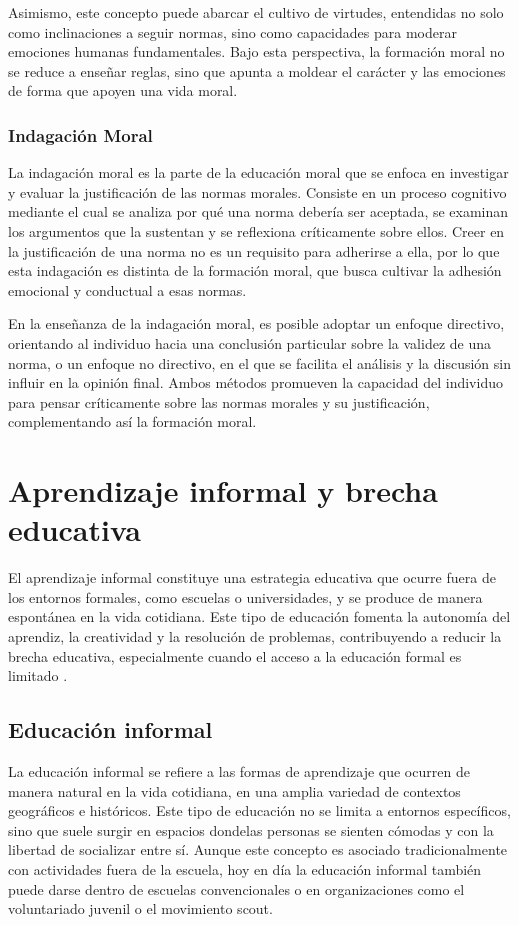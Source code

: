 Asimismo, este concepto puede abarcar el cultivo de virtudes, entendidas no
solo como inclinaciones a seguir normas, sino como capacidades para moderar
emociones humanas fundamentales. Bajo esta perspectiva, la formación moral no
se reduce a enseñar reglas, sino que apunta a moldear el carácter y las
emociones de forma que apoyen una vida moral.\cite{hand2017moral}

\subsubsection{Indagación Moral}
La indagación moral es la parte de la educación moral que se enfoca en
investigar y evaluar la justificación de las normas morales. Consiste en un
proceso cognitivo mediante el cual se analiza por qué una norma debería ser
aceptada, se examinan los argumentos que la sustentan y se reflexiona
críticamente sobre ellos. Creer en la justificación de una norma no es un
requisito para adherirse a ella, por lo que esta indagación es distinta de la
formación moral, que busca cultivar la adhesión emocional y conductual a esas
normas. \cite{hand2017moral}

En la enseñanza de la indagación moral, es posible adoptar un enfoque
directivo, orientando al individuo hacia una conclusión particular sobre la
validez de una norma, o un enfoque no directivo, en el que se facilita el
análisis y la discusión sin influir en la opinión final. Ambos métodos
promueven la capacidad del individuo para pensar críticamente sobre las normas
morales y su justificación, complementando así la formación moral.
\cite{hand2017moral}

\section{Aprendizaje informal y brecha educativa}
El aprendizaje informal constituye una estrategia educativa que ocurre fuera de
los entornos formales, como escuelas o universidades, y se produce de manera
espontánea en la vida cotidiana. Este tipo de educación fomenta la autonomía
del aprendiz, la creatividad y la resolución de problemas, contribuyendo a
reducir la brecha educativa, especialmente cuando el acceso a la educación
formal es limitado \cite{coombs1968world, mills2014informal}.

\subsection{Educación informal}
La educación informal se refiere a las formas de aprendizaje que ocurren de
manera natural en la vida cotidiana, en una amplia variedad de contextos
geográficos e históricos. Este tipo de educación no se limita a entornos
específicos, sino que suele surgir en espacios dondelas personas se sienten
cómodas y con la libertad de socializar entre sí. Aunque este concepto es
asociado tradicionalmente con actividades fuera de la escuela, hoy en día la
educación informal también puede darse dentro de escuelas convencionales o en
organizaciones como el voluntariado juvenil o el movimiento scout.
\cite{mills2014informal}

